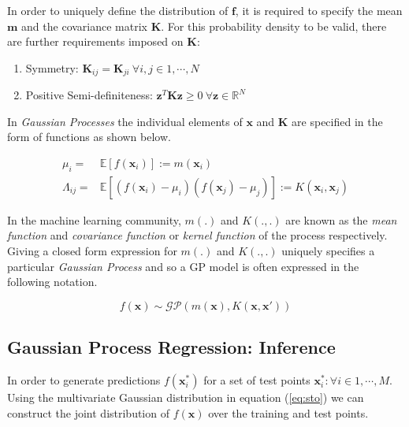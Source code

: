 \documentclass{article}
\begin{document}
In order to uniquely define the distribution of $\mathbf{f}$, it is
required to specify the mean $\mathbf{m}$ and the covariance matrix
$\mathbf{K}$. For this probability density to be valid, there are
further requirements imposed on $\mathbf{K}$: 

\begin{enumerate}
\item Symmetry: $\mathbf{K}_{ij} = \mathbf{K}_{ji} \ \forall i,j \in {1, \cdots, N} $ 
\item Positive Semi-definiteness: $\mathbf{z}^T \mathbf{K} \mathbf{z} \geq 0 \ \forall \mathbf{z} \in \mathbb{R}^N$  
\end{enumerate}

In \emph{Gaussian Processes} the individual elements of $\mathbf{x}$
and $\mathbf{K}$ are specified in the form of functions as shown
below.

\begin{align}
  \mu_i = & \mathbb{E}[f(\mathbf{x}_i)] := m(\mathbf{x}_i) \\
  \Lambda_{ij} = & \mathbb{E}[(f(\mathbf{x}_i) - \mu_i)(f(\mathbf{x}_j) - \mu_j)] := K(\mathbf{x}_i, \mathbf{x}_j)
\end{align}

In the machine learning community, $m(.)$ and $K(.,.)$ are known as
the \emph{mean function} and \emph{covariance function} or
\emph{kernel function} of the process respectively. Giving a closed
form expression for $m(.)$ and $K(.,.)$ uniquely specifies a
particular \emph{Gaussian Process} and so a GP model is often
expressed in the following notation.

\begin{equation}
  f(\mathbf{x}) \sim \mathcal{GP}(m(\mathbf{x}), K(\mathbf{x}, \mathbf{x}'))
\end{equation}

\subsection{Gaussian Process Regression: Inference}

In order to generate predictions $f(\mathbf{x}^{*}_i)$ for a set of
test points $ {\mathbf{x}^{*}_i : \forall i \in 1, \cdots, M} $. Using
the multivariate Gaussian distribution in equation (\ref{eq:sto}) we
can construct the joint distribution of $f(\mathbf{x})$ over the
training and test points.
\end{document}
